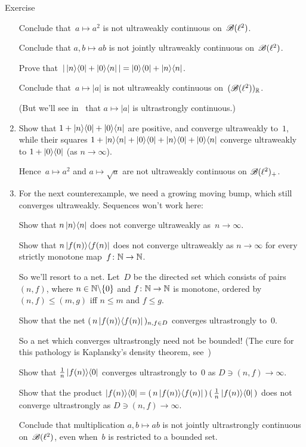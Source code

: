 \documentclass[a]{subfiles}
\begin{document}
\begin{parsec}
\begin{point}{Exercise}
\begin{enumerate}
Conclude that~$a\mapsto a^2$ is not ultraweakly continuous on~$\mathscr{B}(\ell^2)$.

Conclude that $a,b\mapsto ab$ is not jointly ultraweakly continuous
on~$\mathscr{B}(\ell^2)$.

Prove that~$\left|\, \left|n\right>\!\left<0\right|+\left|0\right>\!\left<n\right|\,\right|
= \left|0\right>\!\left<0\right|+\left|n\right>\!\left<n\right|$.

Conclude that~$a\mapsto \left|a\right|$
is not ultraweakly continuous on~$(\mathscr{B}(\ell^2))_{\mathbb{R}}$.

(But we'll see in~\TODO{} that $a\mapsto \left|a\right|$
is ultrastrongly continuous.)
\item
Show that $1+\left|n\right>\!\left<0\right|+\left|0\right>\!\left<n\right|$
are positive,
and 
converge ultraweakly to~$1$,
while their squares
$1+\left|n\right>\!\left<n\right|+\left|0\right>\!\left<0\right|+\left|n\right>\!\left<0\right|+\left|0\right>\!\left<n\right|$
converge ultraweakly to $1+\left|0\right>\!\left<0\right|$
(as $n\to\infty$).

Hence~$a\mapsto a^2$
and $a\mapsto \sqrt{a}$
are not ultraweakly continuous on $\mathscr{B}(\ell^2)_{+}$.

\item
For the next counterexample,
we need a growing moving bump,
which still converges ultraweakly.
Sequences won't work here:

Show that $n\left|n\right>\!\left<n\right|$ does not converge ultraweakly as~$n\to\infty$.

Show that $n \left|f(n)\right>\!\left<f(n)\right|$ does not converge ultraweakly
as $n\to\infty$
for every strictly monotone map~$f\colon \mathbb{N}\to\mathbb{N}$.

So we'll resort to a net.
Let~$D$ be the directed set which consists of pairs $(n,f)$,
where $n\in \mathbb{N}\backslash\{0\}$ and $f\colon \mathbb{N}\to\mathbb{N}$
is monotone, ordered by $(n,f)\leq (m,g)$ iff $n\leq m$ and $f\leq g$.

Show that the net $(\, n\left|f(n)\right>\!\left<f(n)\right|\,)_{n,f\in D}$
converges ultrastrongly to~$0$.

So a net which converges ultrastrongly need not be bounded!
(The cure for this pathology is Kaplansky's density theorem, 
see~\TODO{})

Show that $\frac{1}{n} \left|f(n)\right>\!\left<0\right|$
converges ultrastrongly to~$0$ as $D\ni(n,f)\to \infty$.

Show that the product
$\left|f(n)\right>\!\left<0\right| = (\,n\left|f(n)\right>\!\left<f(n)\right|\,)\,(\,\frac{1}{n}
\left|f(n)\right>\!\left<0\right|\,)$
does not converge ultrastrongly 
as $D\ni(n,f)\to\infty$.

Conclude that multiplication $a,b\mapsto ab$
is not jointly ultrastrongly continuous on~$\mathscr{B}(\ell^2)$,
even when~$b$ is restricted to a bounded set.


\end{enumerate}
\end{point}
\end{parsec}
\end{document}
